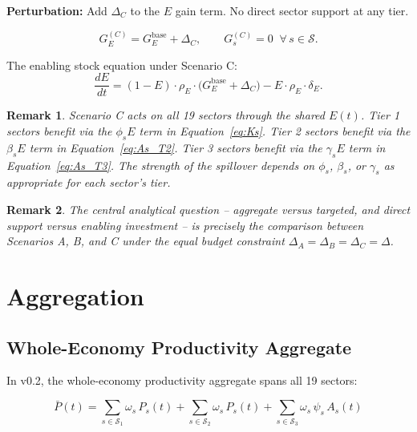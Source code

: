 \documentclass[11pt,a4paper]{article}
\newtheorem{remark}{Remark}
\begin{document}
\textbf{Perturbation:} Add $\Delta_C$ to the $E$ gain term. No direct sector support at any tier.

\begin{equation}
G_E^{(C)} = G_E^{\text{base}} + \Delta_C, \qquad G_s^{(C)} = 0\;\; \forall\, s \in \mathcal{S}.
\label{eq:scenC}
\end{equation}

The enabling stock equation under Scenario C:
\[
\frac{dE}{dt}
= (1 - E)\cdot\rho_E\cdot\bigl(G_E^{\text{base}} + \Delta_C\bigr)
- E\cdot\rho_E\cdot\delta_E.
\]

\begin{remark}
Scenario C acts on all 19 sectors through the shared $E(t)$. Tier 1 sectors benefit via the $\phi_s E$ term in Equation~\eqref{eq:Ks}. Tier 2 sectors benefit via the $\beta_s E$ term in Equation~\eqref{eq:As_T2}. Tier 3 sectors benefit via the $\gamma_s E$ term in Equation~\eqref{eq:As_T3}. The strength of the spillover depends on $\phi_s$, $\beta_s$, or $\gamma_s$ as appropriate for each sector's tier.
\end{remark}

\begin{remark}
The central analytical question -- aggregate versus targeted, and direct support versus enabling investment -- is precisely the comparison between Scenarios A, B, and C under the equal budget constraint $\Delta_A = \Delta_B = \Delta_C = \Delta$.
\end{remark}

\section{Aggregation}
\label{sec:aggregation}

\subsection{Whole-Economy Productivity Aggregate}

In v0.2, the whole-economy productivity aggregate spans all 19 sectors:

\begin{equation}
\bar{P}(t)
= \sum_{s \in \mathcal{S}_1} \omega_s\, P_s(t)
+ \sum_{s \in \mathcal{S}_2} \omega_s\, P_s(t)
+ \sum_{s \in \mathcal{S}_3} \omega_s\, \psi_s\, A_s(t)
\label{eq:Ptotal}
\end{equation}
\end{document}
